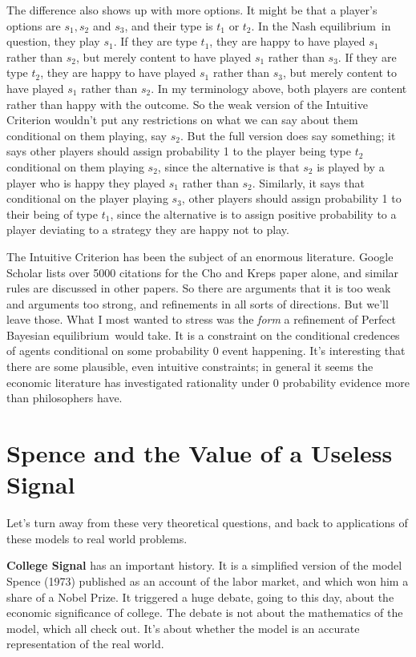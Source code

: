 \documentclass[
  11pt,
  letterpaper,
]{scrbook}
\begin{document}
The difference also shows up with more options. It might be that a
player's options are \(s_1, s_2\) and \(s_3\), and their type is \(t_1\)
or \(t_2\). In the Nash equilibrium~in question, they play \(s_1\). If
they are type \(t_1\), they are happy to have played \(s_1\) rather than
\(s_2\), but merely content to have played \(s_1\) rather than \(s_3\).
If they are type \(t_2\), they are happy to have played \(s_1\) rather
than \(s_3\), but merely content to have played \(s_1\) rather than
\(s_2\). In my terminology above, both players are content rather than
happy with the outcome. So the weak version of the Intuitive Criterion
wouldn't put any restrictions on what we can say about them conditional
on them playing, say \(s_2\). But the full version does say something;
it says other players should assign probability 1 to the player being
type \(t_2\) conditional on them playing \(s_2\), since the alternative
is that \(s_2\) is played by a player who is happy they played \(s_1\)
rather than \(s_2\). Similarly, it says that conditional on the player
playing \(s_3\), other players should assign probability 1 to their
being of type \(t_1\), since the alternative is to assign positive
probability to a player deviating to a strategy they are happy not to
play.

The Intuitive Criterion has been the subject of an enormous literature.
Goo\-gle Scholar lists over 5000 citations for the Cho and Kreps paper
alone, and similar rules are discussed in other papers. So there are
arguments that it is too weak and arguments too strong, and refinements
in all sorts of directions. But we'll leave those. What I most wanted to
stress was the \emph{form} a refinement of Perfect Bayesian
equilibrium~would take. It is a constraint on the conditional credences
of agents conditional on some probability 0 event happening. It's
interesting that there are some plausible, even intuitive constraints;
in general it seems the economic literature has investigated rationality
under 0 probability evidence more than philosophers have.

\section{Spence and the Value of a Useless Signal}\label{sec-spence}

Let's turn away from these very theoretical questions, and back to
applications of these models to real world problems.

\textbf{College Signal} has an important history. It is a simplified
version of the model Spence (1973) published as an account of the labor
market, and which won him a share of a Nobel Prize. It triggered a huge
debate, going to this day, about the economic significance of college.
The debate is not about the mathematics of the model, which all check
out. It's about whether the model is an accurate representation of the
real world.
\end{document}
